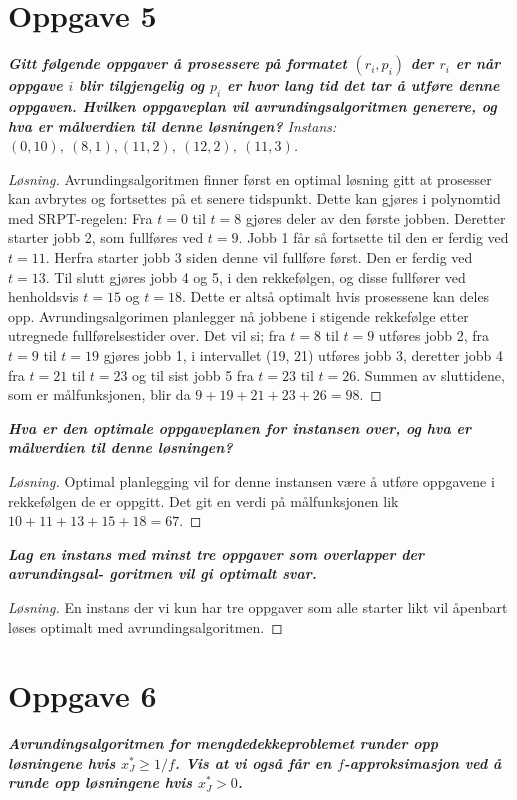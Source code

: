 \documentclass[12pt]{article}
\newenvironment{solution}{\begin{proof}[Løsning]}{\end{proof}}
\begin{document}
\section{Oppgave 5}
\it{\textbf{Gitt følgende oppgaver å prosessere på formatet $(r_i, p_i)$ der $r_i$ er når oppgave $i$ blir tilgjengelig og $p_i$ er hvor lang tid det tar å utføre denne oppgaven. Hvilken oppgaveplan vil avrundingsalgoritmen generere, og hva er målverdien til denne løsningen?}} Instans: $(0, 10), ~(8, 1), (11, 2), ~(12, 2), ~(11, 3)$.

\begin{solution}
Avrundingsalgoritmen finner først en optimal løsning gitt at prosesser kan avbrytes og fortsettes på et senere tidspunkt. Dette kan gjøres i polynomtid med SRPT-regelen: Fra $t=0$ til $t=8$ gjøres deler av den første jobben. Deretter starter jobb 2, som fullføres ved $t=9$. Jobb 1 får så fortsette til den er ferdig ved $t=11$. Herfra starter jobb 3 siden denne vil fullføre først. Den er ferdig ved $t=13$. Til slutt gjøres jobb 4 og 5, i den rekkefølgen, og disse fullfører ved henholdsvis $t=15$ og $t=18$. Dette er altså optimalt hvis prosessene kan deles opp. Avrundingsalgorimen planlegger nå jobbene i stigende rekkefølge etter utregnede fullførelsestider over. Det vil si; fra $t=8$ til $t=9$ utføres jobb 2, fra $t=9$ til $t=19$ gjøres jobb 1, i intervallet (19, 21) utføres jobb 3, deretter jobb 4 fra $t=21$ til $t=23$ og til sist jobb 5 fra $t=23$ til $t=26$. Summen av sluttidene, som er målfunksjonen, blir da $9+19+21+23+26=98$.
\end{solution}

\it{\textbf{Hva er den optimale oppgaveplanen for instansen over, og hva er målverdien til denne løsningen?}}

\begin{solution}
Optimal planlegging vil for denne instansen være å utføre oppgavene i rekkefølgen de er oppgitt. Det git en verdi på målfunksjonen lik $10+11+13+15+18=67$.
\end{solution}

\it{\textbf{Lag en instans med minst tre oppgaver som overlapper der avrundingsal- goritmen vil gi optimalt svar.}}

\begin{solution}
En instans der vi kun har tre oppgaver som alle starter likt vil åpenbart løses optimalt med avrundingsalgoritmen.
\end{solution}


\section{Oppgave 6}
\it{\textbf{Avrundingsalgoritmen for mengdedekkeproblemet runder opp løsningene hvis $x_J^*\geq 1/f$. Vis at vi også får en $f$-approksimasjon ved å runde opp løsningene hvis $x_J^* > 0$.}}
\end{document}
